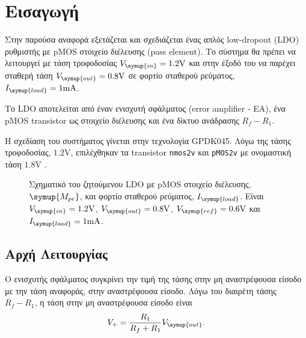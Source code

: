 \section{Εισαγωγή}\label{section:intro}

Στην παρούσα αναφορά εξετάζεται και σχεδιάζεται ένας απλός low-dropout (LDO) ρυθμιστής με pMOS στοιχείο διέλευσης (pass element). Το σύστημα θα πρέπει να λειτουργεί με τάση τροφοδοσίας $V_{\symup{in}}=1.2\unit{\volt}$ και στην έξοδό του να παρέχει σταθερή τάση $V_{\symup{out}}=0.8\unit{\volt}$ σε φορτίο σταθερού ρεύματος, $I_{\symup{load}}=1\unit{\milli\ampere}$.\par
Το LDO αποτελείται από έναν ενισχυτή σφάλματος (error amplifier - EA), ένα pMOS transistor ως στοιχείο διέλευσης και ένα δίκτυο ανάδρασης $R_{f}-R_{1}$.\par
Η σχεδίαση του συστήματος γίνεται στην τεχνολογία GPDK045. Λόγω της τάσης τροφοδοσίας, $1.2\unit{\unit\volt}$, επιλέχθηκαν τα transistor \texttt{nmos2v} και \texttt{pMOS2v} με ονομαστική τάση $1.8\unit{\volt}$ \cite{gpdk045ref}.

\begin{figure}[h!]
	\centering
	
	\caption{Σχηματικό του ζητούμενου LDO με pMOS στοιχείο διέλευσης, $\symup{M_{pe}}$, και φορτίο σταθερού ρεύματος, $I_{\symup{load}}$. Είναι $V_{\symup{in}}=1.2\unit{\volt}$, $V_{\symup{out}}=0.8\unit{\volt}$, $V_{\symup{ref}}=0.6\unit{\volt}$ και $I_{\symup{load}}=1\unit{\milli\ampere}$.}
	\label{fig:LDO:schematic}
\end{figure}

\subsection{Αρχή Λειτουργίας}

Ο ενισχυτής σφάλματος συγκρίνει την τιμή της τάσης στην μη αναστρέφουσα είσοδο με την τάση αναφοράς, στην αναστρέφουσα είσοδο. Λόγω του διαιρέτη τάσης $R_f-R_1$, η τάση στην μη αναστρέφουσα είσοδο είναι
\begin{equation*}
	V_{+}=\frac{R_1}{R_f + R_1}V_{\symup{out}}.
\end{equation*}

